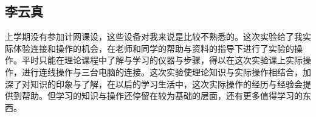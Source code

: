 \subsection{李云真}
上学期没有参加计网课设，这些设备对我来说是比较不熟悉的。这次实验给了我实际体验连接和操作的机会，在老师和同学的帮助与资料的指导下进行了实验的操作。平时只能在理论课程中了解与学习的仪器与步骤，得以在这次实验课上实际操作，进行连线操作与三台电脑的连接。这次实验使理论知识与实际操作相结合，加深了对知识的印象与了解，在以后的学习生活中，这次实际操作的经历与经验会提供到帮助。但学习的知识与操作还停留在较为基础的层面，还有更多值得学习的东西。
